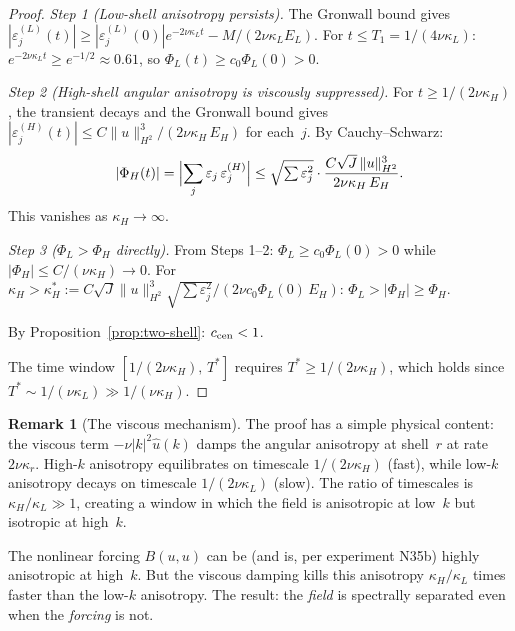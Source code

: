 \documentclass[11pt]{article}
\theoremstyle{definition}
\newtheorem{remark}[theorem]{Remark}
\begin{document}
\begin{proof}
\textit{Step 1 (Low-shell anisotropy persists).}
The Gronwall bound gives $|\varepsilon_j^{(L)}(t)|
\geq |\varepsilon_j^{(L)}(0)|e^{-2\nu\kappa_L t}
- M/(2\nu\kappa_L E_L)$.  For
$t\leq T_1 = 1/(4\nu\kappa_L)$:
$e^{-2\nu\kappa_L t}\geq e^{-1/2}\approx 0.61$,
so $\Phi_L(t)\geq c_0\Phi_L(0)>0$.

\textit{Step 2 (High-shell angular anisotropy is
viscously suppressed).}
For $t\geq 1/(2\nu\kappa_H)$, the transient decays
and the Gronwall bound gives
$|\varepsilon_j^{(H)}(t)|\leq
C\|u\|_{H^2}^3/(2\nu\kappa_H\,E_H)$ for each~$j$.
By Cauchy--Schwarz:
\begin{equation}\label{eq:PhiH-bound}
|\Phi_H(t)| = \Bigl|\sum_j\varepsilon_j\,
\varepsilon_j^{(H)}\Bigr|
\leq \sqrt{\textstyle\sum\varepsilon_j^2}\cdot
\frac{C\sqrt{J}\,\|u\|_{H^2}^3}{2\nu\kappa_H\,E_H}.
\end{equation}
This vanishes as $\kappa_H\to\infty$.

\textit{Step 3 ($\Phi_L>\Phi_H$ directly).}
From Steps 1--2: $\Phi_L\geq c_0\Phi_L(0)>0$
while $|\Phi_H|\leq C/(\nu\kappa_H)\to 0$.
For $\kappa_H>\kappa_H^* :=
C\sqrt{J}\|u\|_{H^2}^3\sqrt{\sum\varepsilon_j^2}
/(2\nu c_0\Phi_L(0)\,E_H)$:
$\Phi_L>|\Phi_H|\geq\Phi_H$.

By Proposition~\ref{prop:two-shell}: $c_{\rm cen}<1$.

The time window $[1/(2\nu\kappa_H),\,T^*]$
requires $T^*\geq 1/(2\nu\kappa_H)$, which holds
since $T^*\sim 1/(\nu\kappa_L)\gg 1/(\nu\kappa_H)$.
\end{proof}

\begin{remark}[The viscous mechanism]
\label{rem:viscous-mechanism}
The proof has a simple physical content: the
viscous term $-\nu|k|^2\hat u(k)$ damps the
angular anisotropy at shell~$r$ at rate
$2\nu\kappa_r$.  High-$k$ anisotropy equilibrates
on timescale $1/(2\nu\kappa_H)$ (fast), while
low-$k$ anisotropy decays on timescale
$1/(2\nu\kappa_L)$ (slow).  The ratio of
timescales is $\kappa_H/\kappa_L\gg 1$, creating
a window in which the field is anisotropic at
low~$k$ but isotropic at high~$k$.

The nonlinear forcing $B(u,u)$ can be (and is,
per experiment N35b) highly anisotropic at high~$k$.
But the viscous damping kills this anisotropy
$\kappa_H/\kappa_L$ times faster than the low-$k$
anisotropy.  The result: the \emph{field} is
spectrally separated even when the \emph{forcing}
is not.
\end{remark}
\end{document}
